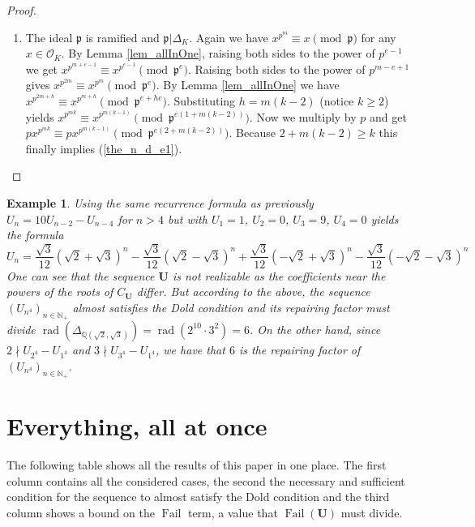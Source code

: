 \documentclass[preprint,12pt]{elsarticle}
\newcommand{\N}{\mathbb{N}}
\newcommand{\Q}{\mathbb{Q}}
\newcommand{\OO}{\mathcal{O}}
\newcommand{\pp}{\mathfrak{p} }
\DeclareMathOperator{\rad}{rad}
\DeclareMathOperator{\fail}{Fail}
\newtheorem{example}{Example}
\begin{document}
\begin{proof}
\begin{enumerate}
    \item  The ideal $\pp$ is ramified and $\pp|\Delta_K$. Again we have $x^{p^{m}} \equiv x \pmod \pp$ for any $x\in\OO_K$. By Lemma \ref{lem_allInOne}, raising both sides to the power of ${p^{e-1}}$ we get $x^{p^{m+e-1}} \equiv x^{p^{e-1}} \pmod {\pp^e}$. Raising both sides to the power of $p^{m-e+1}$ gives $x^{p^{2m}} \equiv x^{p^{m}} \pmod {\pp^e}$. By Lemma \ref{lem_allInOne} we have $x^{p^{2m+h}} \equiv x^{p^{m+h}} \pmod {\pp^{e+he}}$. Substituting $h=m(k-2)$ (notice $k\geqslant 2$) yields $x^{p^{mk}} \equiv x^{p^{m(k-1)}} \pmod {\pp^{e(1+m(k-2))}}$. Now we multiply by $p$ and get   $px^{p^{mk}} \equiv px^{p^{m(k-1)}} \pmod {\pp^{e(2+m(k-2))}}$. Because $2+m(k-2) \geqslant k$ this finally implies (\ref{the_n_d_e1}).
\end{enumerate}

\end{proof}

\begin{example}
   Using the same recurrence formula as previously $U_{n} = 10U_{n-2} - U_{n-4}$ for $n>4$ but with $U_1 = 1$, $U_2 = 0$, $U_3=9$, $U_4=0$ yields the formula
   $$
    {U}_n = 
        \frac{\sqrt{3}}{12}\left(\sqrt{2}+\sqrt{3}\right)^n
        -\frac{\sqrt{3}}{12}\left(\sqrt{2}-\sqrt{3}\right)^n
        +\frac{\sqrt{3}}{12}\left(-\sqrt{2}+\sqrt{3}\right)^n
        -\frac{\sqrt{3}}{12}\left(-\sqrt{2}-\sqrt{3}\right)^n
    $$
    One can see that the sequence $\textbf{U}$ is not realizable as the coefficients near the powers of the roots of $C_{\textbf{U}}$ differ. But according to the above, the sequence $({U}_{n^4})_{n\in\N_+}$ almost satisfies the Dold condition  and its repairing factor must divide $\rad\left(\Delta_{\Q(\sqrt{2}, \sqrt{3})}\right) = \rad(2^{10}\cdot3^2) = 6$. On the other hand, since $2\nmid U_{2^4}-U_{1^4}$ and $3\nmid U_{3^4}-U_{1^4}$, we have that $6$ is the repairing factor of $({U}_{n^4})_{n\in\N_+}$.
    
\end{example}












\section{Everything, all at once}

The following table shows all the results of this paper in one place. The first column contains all the considered cases, the second the  necessary and sufficient condition for the sequence to almost satisfy the Dold condition and the third column shows a bound on the $\fail$ term, a value that $\fail(\mathbf{U})$ must divide.
\end{document}
